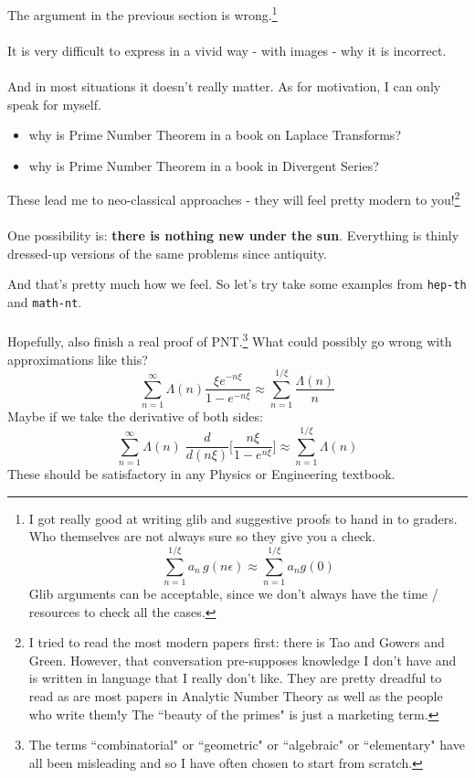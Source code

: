 \documentclass[12pt]{article}
\begin{document}
\newpage

\selectfont \fontsize{25}{30}\selectfont

\noindent The argument in the previous section is wrong.\footnote{I got really good at writing glib and suggestive proofs to hand in to graders.  Who themselves are not always sure so they give you a check.
$$ \sum^{1/\xi}_{n=1} a_n \, g( n \epsilon) \approx \sum^{1/\xi}_{n=1} a_n g(0) $$
Glib arguments can be acceptable, since we don't always have the time / resources to check all the cases.}  \\ \\It is very difficult to express in a vivid way - with images - why it is incorrect.  \\ \\
And in most situations it doesn't really matter. As for motivation, I can only speak for myself. \\
\begin{itemize}
\item why is Prime Number Theorem in a book on Laplace Transforms?
\item why is Prime Number Theorem in a book in Divergent Series? \\
\end{itemize}
These lead me to neo-classical approaches - they will feel pretty modern to you!\footnote{I tried to read the most modern papers first: there is Tao and Gowers and Green.  However, that conversation pre-supposes knowledge I don't have and is written in language that I really don't like.  They are pretty dreadful to read as are most papers in Analytic Number Theory as well as the people who write them!y  The ``beauty of the primes" is just a marketing term.} \\ \\
One possibility is: \textbf{there is nothing new under the sun}.  Everything is thinly dressed-up versions of the same problems since antiquity.
\newpage

\noindent And that's pretty much how we feel.  So let's try take some examples from \texttt{hep-th} and \texttt{math-nt}. \\ \\
Hopefully, also finish a real proof of PNT.\footnote{The terms ``combinatorial" or ``geometric" or ``algebraic" or ``elementary" have all been misleading and so I have often chosen to start from scratch.}  What could possibly go wrong with approximations like this? 
$$ \sum_{n=1}^\infty \Lambda(n) \frac{\xi e^{-n\xi}}{1-e^{-n\xi}} \approx \sum_{n=1}^{1/\xi} \frac{\Lambda(n)}{n} $$
Maybe if we take the derivative of both sides:
$$  \sum_{n=1}^\infty \Lambda(n) \; \frac{d}{d(n\xi)}\bigg[ \frac{n\xi }{1-e^{n\xi}} \bigg]  \approx \sum_{n=1}^{1/\xi} \Lambda(n) $$
These should be satisfactory in any Physics or Engineering textbook. 
\end{document}
